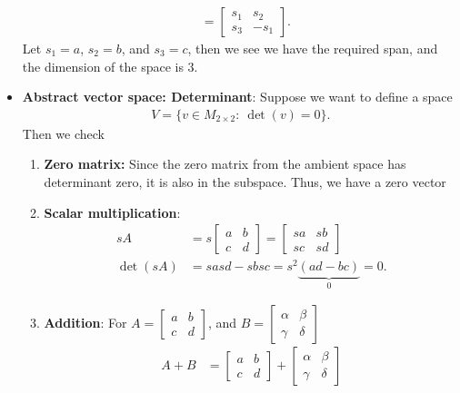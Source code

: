 \documentclass{report}
\begin{document}
\begin{itemize}
\begin{align*}
                                   &=\begin{bmatrix} s_1 & s_2 \\ s_3 & -s_{1}\end{bmatrix}
            .\end{align*}
            Let $s_1 = a$, $s_2 = b$, and $s_3 = c$, then we see we have the required span, and the dimension of the space is 3.
        \item \textbf{Abstract vector space: Determinant}: Suppose we want to define a space
            \begin{align*}
                V = \{v \in M_{2\times 2}:\ \det(v) = 0\}
            .\end{align*}
            Then we check
            \begin{enumerate}
                \item \textbf{Zero matrix:} Since the zero matrix from the ambient space has determinant zero, it is also in the subspace. Thus, we have a zero vector
                \item \textbf{Scalar multiplication}: 
                    \begin{align*}
                        sA &= s \begin{bmatrix} a & b \\ c & d \end{bmatrix} = \begin{bmatrix} sa & sb \\ sc & sd \end{bmatrix}  \\
                        \det(sA)&= sasd - sbsc = s^{2}\underbrace{(ad - bc)}_{0} = 0
                    .\end{align*}
                \item \textbf{Addition}: For $A = \begin{bmatrix} a & b \\ c & d\end{bmatrix} $, and $B = \begin{bmatrix} \alpha & \beta \\ \gamma & \delta \end{bmatrix} $
                    \begin{align*}
                        A   + B &= \begin{bmatrix} a & b \\ c & d \end{bmatrix} + \begin{bmatrix} \alpha & \beta \\ \gamma & \delta \end{bmatrix}  \\

\end{align*}
\end{enumerate}
\end{itemize}
\end{document}
